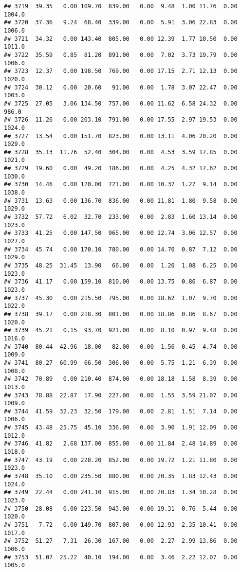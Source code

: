 \documentclass{article}\usepackage{graphicx, color}
\makeatletter
\newenvironment{kframe}{%
 \def\at@end@of@kframe{}%
 \ifinner\ifhmode%
  \def\at@end@of@kframe{\end{minipage}}%
  \begin{minipage}{\columnwidth}%
 \fi\fi%
 \def\FrameCommand##1{\hskip\@totalleftmargin \hskip-\fboxsep
 \colorbox{shadecolor}{##1}\hskip-\fboxsep
     \hskip-\linewidth \hskip-\@totalleftmargin \hskip\columnwidth}%
 \MakeFramed {\advance\hsize-\width
   \@totalleftmargin\z@ \linewidth\hsize
   \@setminipage}}%
 {\par\unskip\endMakeFramed%
 \at@end@of@kframe}
\newenvironment{knitrout}{}{} %
\makeatother
\begin{document}
\begin{knitrout}
\begin{kframe}
\begin{verbatim}
## 3719  39.35   0.00 109.70  839.00   0.00  9.48  1.00 11.76  0.00 1004.0
## 3720  37.36   9.24  68.40  339.00   0.00  5.91  3.06 22.83  0.00 1006.0
## 3721  34.32   0.00 143.40  805.00   0.00 12.39  1.77 10.50  0.00 1011.0
## 3722  35.59   0.85  81.20  891.00   0.00  7.02  3.73 19.79  0.00 1006.0
## 3723  12.37   0.00 198.50  769.00   0.00 17.15  2.71 12.13  0.00 1020.0
## 3724  30.12   0.00  20.60   91.00   0.00  1.78  3.07 22.47  0.00 1003.0
## 3725  27.05   3.06 134.50  757.00   0.00 11.62  6.58 24.32  0.00  986.0
## 3726  11.26   0.00 203.10  791.00   0.00 17.55  2.97 19.53  0.00 1024.0
## 3727  13.54   0.00 151.70  823.00   0.00 13.11  4.06 20.20  0.00 1029.0
## 3728  35.13  11.76  52.40  304.00   0.00  4.53  3.59 17.85  0.00 1021.0
## 3729  19.60   0.00  49.20  186.00   0.00  4.25  4.32 17.62  0.00 1030.0
## 3730  14.46   0.00 120.00  721.00   0.00 10.37  1.27  9.14  0.00 1038.0
## 3731  13.63   0.00 136.70  836.00   0.00 11.81  1.80  9.58  0.00 1029.0
## 3732  57.72   6.02  32.70  233.00   0.00  2.83  1.60 13.14  0.00 1023.0
## 3733  41.25   0.00 147.50  965.00   0.00 12.74  3.06 12.57  0.00 1027.0
## 3734  45.74   0.00 170.10  780.00   0.00 14.70  0.87  7.12  0.00 1029.0
## 3735  48.25  31.45  13.90   66.00   0.00  1.20  1.08  6.25  0.00 1023.0
## 3736  41.17   0.00 159.10  810.00   0.00 13.75  0.86  6.87  0.00 1023.0
## 3737  45.30   0.00 215.50  795.00   0.00 18.62  1.07  9.70  0.00 1022.0
## 3738  39.17   0.00 218.30  801.00   0.00 18.86  0.86  8.67  0.00 1020.0
## 3739  45.21   0.15  93.70  921.00   0.00  8.10  0.97  9.48  0.00 1016.0
## 3740  80.44  42.96  18.00   82.00   0.00  1.56  0.45  4.74  0.00 1009.0
## 3741  80.27  60.99  66.50  306.00   0.00  5.75  1.21  6.39  0.00 1008.0
## 3742  70.89   0.00 210.40  874.00   0.00 18.18  1.58  8.39  0.00 1013.0
## 3743  78.88  22.87  17.90  227.00   0.00  1.55  3.59 21.07  0.00 1009.0
## 3744  41.59  32.23  32.50  179.00   0.00  2.81  1.51  7.14  0.00 1006.0
## 3745  43.48  25.75  45.10  336.00   0.00  3.90  1.91 12.09  0.00 1012.0
## 3746  41.82   2.68 137.00  855.00   0.00 11.84  2.48 14.89  0.00 1018.0
## 3747  43.19   0.00 228.20  852.00   0.00 19.72  1.21 11.80  0.00 1023.0
## 3748  35.10   0.00 235.50  880.00   0.00 20.35  1.83 12.43  0.00 1024.0
## 3749  22.44   0.00 241.10  915.00   0.00 20.83  1.34 10.28  0.00 1023.0
## 3750  28.08   0.00 223.50  943.00   0.00 19.31  0.76  5.44  0.00 1020.0
## 3751   7.72   0.00 149.70  807.00   0.00 12.93  2.35 10.41  0.00 1017.0
## 3752  51.27   7.31  26.30  167.00   0.00  2.27  2.99 13.86  0.00 1006.0
## 3753  51.07  25.22  40.10  194.00   0.00  3.46  2.22 12.07  0.00 1005.0

\end{verbatim}
\end{kframe}
\end{knitrout}
\end{document}
